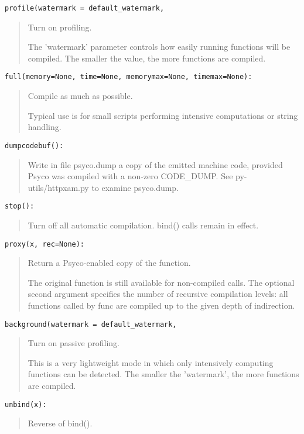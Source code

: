 \documentclass[10pt,english]{article}
\begin{document}
\texttt{profile(watermark   = default{\_}watermark,}
\begin{quote}

Turn on profiling.

The 'watermark' parameter controls how easily running functions will
be compiled. The smaller the value, the more functions are compiled.
\end{quote}

\texttt{full(memory=None, time=None, memorymax=None, timemax=None):}
\begin{quote}

Compile as much as possible.

Typical use is for small scripts performing intensive computations
or string handling.
\end{quote}

\texttt{dumpcodebuf():}
\begin{quote}

Write in file psyco.dump a copy of the emitted machine code,
provided Psyco was compiled with a non-zero CODE{\_}DUMP.
See py-utils/httpxam.py to examine psyco.dump.
\end{quote}

\texttt{stop():}
\begin{quote}

Turn off all automatic compilation.  bind() calls remain in effect.
\end{quote}

\texttt{proxy(x, rec=None):}
\begin{quote}

Return a Psyco-enabled copy of the function.

The original function is still available for non-compiled calls.
The optional second argument specifies the number of recursive
compilation levels: all functions called by func are compiled
up to the given depth of indirection.
\end{quote}

\texttt{background(watermark   = default{\_}watermark,}
\begin{quote}

Turn on passive profiling.

This is a very lightweight mode in which only intensively computing
functions can be detected. The smaller the 'watermark', the more functions
are compiled.
\end{quote}

\texttt{unbind(x):}
\begin{quote}

Reverse of bind().
\end{quote}
\end{document}
